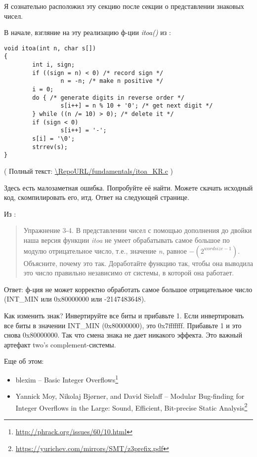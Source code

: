 
Я сознательно расположил эту секцию после секции о представлении знаковых чисел.

В начале, взгляние на эту реализацию ф-ции \emph{itoa()} из \InSqBrackets{\KRBook}:

\begin{lstlisting}[style=customc]
void itoa(int n, char s[])
{
        int i, sign;
        if ((sign = n) < 0) /* record sign */
                n = -n; /* make n positive */
        i = 0;
        do { /* generate digits in reverse order */
                s[i++] = n % 10 + '0'; /* get next digit */
        } while ((n /= 10) > 0); /* delete it */
        if (sign < 0)
                s[i++] = '-';
        s[i] = '\0';
        strrev(s);
}
\end{lstlisting}

( Полный текст: \url{\RepoURL/fundamentals/itoa_KR.c} )

Здесь есть малозаметная ошибка. Попробуйте её найти. Можете скачать исходный код, скомпилировать его, итд.
Ответ на следующей странице.

\clearpage

Из \InSqBrackets{\KRBook}:

\begin{framed}
\begin{quotation}
Упражнение 3-4. В представлении чисел с помощью дополнения до двойки наша версия функции \emph{itoa}
не умеет обрабатывать самое большое по модулю отрицательное число, т.е., значение 
\emph{n}, равное $-(2^{wordsize-1})$. Объясните, почему это так. Доработайте функцию так, чтобы она
выводила это число правильно независимо от системы, в которой она работает.
\end{quotation}
\end{framed}

Ответ: ф-ция не может корректно обработать самое большое отрицательное число (INT\_MIN или 0x80000000 или -2147483648).

Как изменить знак? Инвертируйте все биты и прибавьте 1.
Если инвертировать все биты в значении INT\_MIN (0x80000000), это 0x7fffffff. Прибавьте 1 и это снова 0x80000000.
Так что смена знака не дает никакого эффекта.
Это важный артефакт two's complement-системы.

Еще об этом:

\begin{itemize}
\item blexim -- Basic Integer Overflows\footnote{\url{http://phrack.org/issues/60/10.html}}

\item Yannick Moy, Nikolaj Bjørner, and David Sielaff -- Modular Bug-finding for Integer Overflows in the Large: Sound, Efficient, Bit-precise Static Analysis\footnote{\url{https://yurichev.com/mirrors/SMT/z3prefix.pdf}}
\end{itemize}

